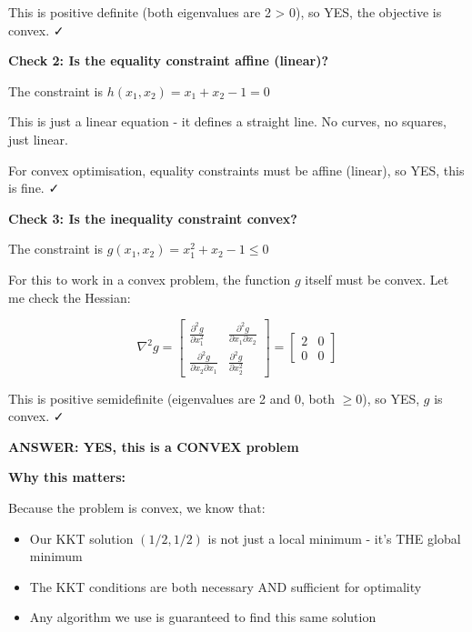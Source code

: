 \documentclass[11pt]{article}
\newenvironment{answerbox}
  {\begin{framed}\begin{center}\large\bfseries}
  {\end{center}\end{framed}}
\begin{document}
This is positive definite (both eigenvalues are 2 > 0), so YES, the objective is convex. ✓

\vspace{0.5em}

\textbf{Check 2: Is the equality constraint affine (linear)?}

The constraint is $h(x_1, x_2) = x_1 + x_2 - 1 = 0$

This is just a linear equation - it defines a straight line. No curves, no squares, just linear.

For convex optimisation, equality constraints must be affine (linear), so YES, this is fine. ✓

\vspace{0.5em}

\textbf{Check 3: Is the inequality constraint convex?}

The constraint is $g(x_1, x_2) = x_1^2 + x_2 - 1 \leq 0$

For this to work in a convex problem, the function $g$ itself must be convex. Let me check the Hessian:

\begin{equation*}
\nabla^2 g = \begin{bmatrix} \frac{\partial^2 g}{\partial x_1^2} & \frac{\partial^2 g}{\partial x_1 \partial x_2} \\ \frac{\partial^2 g}{\partial x_2 \partial x_1} & \frac{\partial^2 g}{\partial x_2^2} \end{bmatrix} = \begin{bmatrix} 2 & 0 \\ 0 & 0 \end{bmatrix}
\end{equation*}

This is positive semidefinite (eigenvalues are 2 and 0, both $\geq 0$), so YES, $g$ is convex. ✓

\vspace{1em}

\begin{answerbox}
\textbf{ANSWER: YES, this is a CONVEX problem}
\end{answerbox}

\vspace{0.5em}

\textbf{Why this matters:}

Because the problem is convex, we know that:
\begin{itemize}
\item Our KKT solution $(1/2, 1/2)$ is not just a local minimum - it's THE global minimum
\item The KKT conditions are both necessary AND sufficient for optimality
\item Any algorithm we use is guaranteed to find this same solution
\end{itemize}
\end{document}
